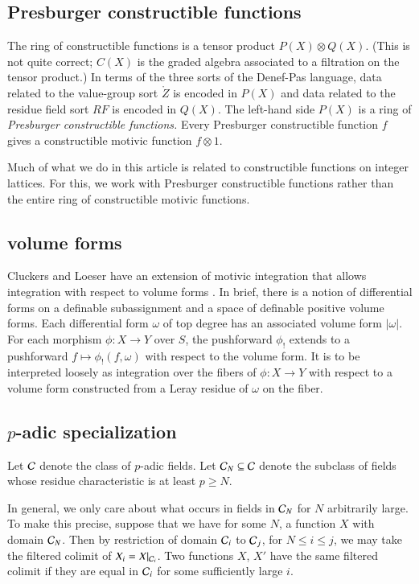 \subsection{Presburger constructible functions}

The ring of constructible functions is a tensor product $P(X) \otimes
Q(X)$.  (This is not quite correct; $C(X)$ is the graded algebra
associated to a filtration on the tensor product.)  In terms of the
three sorts of the Denef-Pas language, data related to the value-group
sort $\ring{Z}$ is encoded in $P(X)$ and data related to the residue
field sort $RF$ is encoded in $Q(X)$.  The left-hand side $P(X)$ is a
ring of {\it Presburger constructible functions.}  Every Presburger
constructible function $f$ gives a constructible motivic function
$f\otimes 1$.

Much of what we do in this article is related to constructible
functions on integer lattices.  For this, we work with Presburger
constructible functions rather than the entire ring of constructible
motivic functions.

\subsection{volume forms}

Cluckers and Loeser have an extension of motivic integration that
allows integration with respect to volume forms
\cite[\S8]{cluckers2008constructible}.  In brief, there is a notion of
differential forms on a definable subassignment and a space of
definable positive volume forms.  Each differential form $\omega$ of
top degree has an associated volume form $|\omega|$.  For each
morphism $\phi:X\to Y$ over $S$, the pushforward $\phi_!$ extends to a
pushforward $f \mapsto \phi_!(f,\omega)$ with respect to the volume
form.  It is to be interpreted loosely as integration over the fibers
of $\phi:X\to Y$ with respect to a volume form constructed from a
Leray residue of $\omega$ on the fiber.

\subsection{$p$-adic specialization}

Let $\mathcal C$ denote the class of $p$-adic fields.  Let $\mathcal C_N\subseteq \mathcal C$
denote the subclass of fields whose residue characteristic is at least
$p\ge N$.

In general, we only care about what occurs in fields in $\mathcal C_N$ for $N$
arbitrarily large.  To make this precise, suppose that we have for
some $N$, a function $X$ with domain $\mathcal C_N$.  Then by restriction of
domain $\mathcal C_i$ to $\mathcal C_{j}$, for $N\le i\le j$, we may take the filtered
colimit of $X_i=X|_{\mathcal C_i}$.  Two functions $X$, $X'$ have the same
filtered colimit if they are equal in $\mathcal C_i$ for some sufficiently
large $i$.

